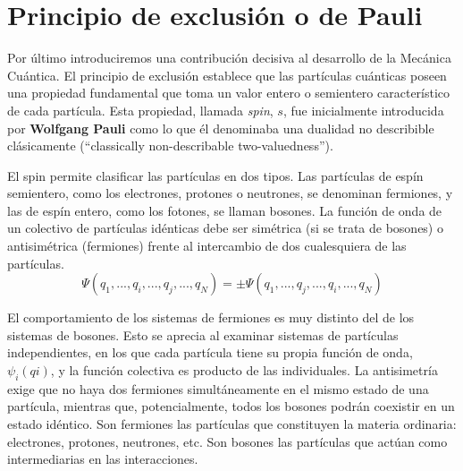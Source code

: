 \documentclass{tufte-handout}
\begin{document}
\section{Principio de exclusión o de Pauli}
Por último introduciremos una contribución decisiva
al desarrollo de la Mecánica Cuántica. El principio de
exclusión establece que las partículas cuánticas poseen una 
propiedad fundamental que toma un valor entero o semientero 
característico de cada partícula. Esta propiedad, 
llamada \textit{spin}, $s$, fue inicialmente introducida
por \textbf{Wolfgang Pauli} como lo que él denominaba una
dualidad no
describible clásicamente (``classically non-describable
two-valuedness'').

El spin permite clasificar las partículas en dos tipos.
Las partículas de espín semientero, como los electrones,
protones o neutrones, 
se denominan fermiones, y las de espín entero, como los
fotones, se llaman bosones. La función de onda de un 
colectivo de partículas idénticas debe ser simétrica 
(si se trata de bosones) o antisimétrica (fermiones) 
frente al intercambio de dos cualesquiera de las partículas.
\begin{equation}
    \Psi(q_1, ..., q_i, ..., q_j, ..., q_N)=\pm 
    \Psi(q_1, ..., q_j, ..., q_i, ..., q_N)
\end{equation}

El comportamiento de los sistemas de fermiones es muy 
distinto del de los sistemas de bosones. Esto se aprecia
al examinar sistemas de partículas independientes, en los
que cada partícula tiene su propia función de onda,
$\psi_i(qi)$, y la función colectiva es producto de las
individuales. La antisimetría exige que no haya dos 
fermiones simultáneamente en el mismo estado de una 
partícula, mientras que, potencialmente, todos los bosones
podrán coexistir en un estado idéntico.
Son fermiones las partículas que constituyen la materia
ordinaria: electrones, protones, neutrones, etc. Son 
bosones las partículas que actúan como intermediarias 
en las interacciones.

%
%
%

\end{document}
